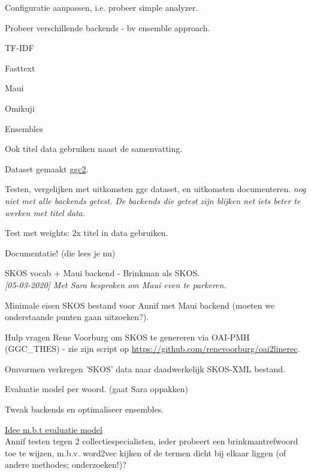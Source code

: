 \documentclass{article}
\newcommand{\cmark}{\ding{51}}%
\newcommand{\xmark}{\ding{55}}%
\newcommand{\done}{\rlap{$\square$}{\raisebox{2pt}{\large\hspace{1pt}\cmark}}%
\hspace{-2.5pt}}
\newcommand{\wontfix}{\rlap{$\square$}{\large\hspace{1pt}\xmark}}
\begin{document}
  \begin{todolist}
    \item[\done] Configuratie aanpassen, i.e. probeer simple analyzer.
    \item Probeer verschillende backends - bv ensemble approach.
    
    \begin{todolist}
      \item[\done] TF-IDF
      \item[\done] Fasttext
      \item Maui 
      \item[\done] Omikuji
      \item Ensembles
    \end{todolist}

    \item Ook titel data gebruiken naast de samenvatting.
    \begin{todolist}
        \item[\done] Dataset gemaakt \href{https://github.com/KBNLresearch/Annif_data_exp/blob/master/vocab2.zip}{ggc2}.
        \item Testen, vergelijken met uitkomsten ggc dataset, en uitkomsten documenteren. \textit{nog niet met alle backends getest. De backends die getest zijn blijken net iets beter te werken met titel data.}
        \item Test met weights: 2x titel in data gebruiken.
    \end{todolist}
    \item Documentatie! (die lees je nu)
    \item SKOS vocab + Maui backend - Brinkman als SKOS. \\ 
    \textit{[05-03-2020] Met Sara besproken om Maui even te parkeren.}
    \begin{todolist}
      \item Minimale eisen SKOS bestand voor Annif met Maui backend (moeten we onderstaande punten gaan uitzoeken?).
      \item[\done] Hulp vragen Rene Voorburg om SKOS te genereren via OAI-PMH (GGC\_THES) - zie zijn script op \url{https://github.com/renevoorburg/oai2linerec}.
      \item Omvormen verkregen 'SKOS' data naar daadwerkelijk SKOS-XML bestand. 
      \item[\wontfix] Evaluatie model per woord. (gaat Sara oppakken)
    \end{todolist}
    \item Tweak backends en optimaliseer ensembles.
    \item \href{https://github.com/NatLibFi/Annif/wiki/Achieving-good-results}{Idee m.b.t evaluatie model} \\
    Annif testen tegen 2 collectiespecialisten, ieder probeert een brinkmantrefwoord toe te wijzen, m.b.v. word2vec kijken of de termen dicht bij elkaar liggen (of andere methodes; onderzoeken!)?
  \end{todolist}
\end{document}
